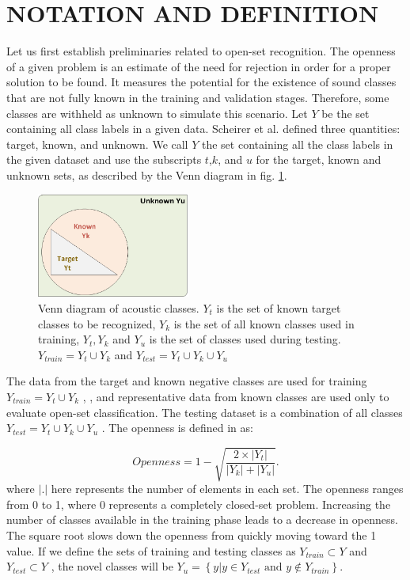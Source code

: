 \documentclass{ieeeaccess}
\begin{document}
\section{NOTATION AND DEFINITION} \label{sec:III}
Let us first establish preliminaries related to open-set recognition. The openness of a given problem is an estimate of the need for rejection in order for a proper solution to be found. It measures the potential for the existence of sound classes that are not fully known in the training and validation stages. Therefore, some classes are withheld as unknown to simulate this scenario. Let $Y$ be the set containing all class labels in a given data. Scheirer et al. \cite{b2} defined three quantities: target, known, and unknown. We call $Y$ the set containing all the class labels in the given dataset and use the subscripts $t$,$k$, and $u$  for the target, known and unknown sets, as described by the Venn diagram in fig. \ref{fig:fig1}.
\begin{figure}[t!]
	\centering
	\includegraphics[width=0.45\textwidth]{img/venndiagram.png}
	\caption{Venn diagram of acoustic classes. $Y_{t}$    is the set of known target classes to be recognized,   $Y_{k}$ is the set of all known classes used in training, $Y_{t},Y_{k}$ and $Y_{u}$  is the set of classes used during testing. $Y_{train}=Y_{t} \cup  Y_{k}  $  and $Y_{test}=Y_{t} \cup  Y_{k} \cup  Y_{u} $ }
	\label{fig:fig1}
\end{figure}
The data from the target and known negative classes are used for training  $Y_{train}=Y_{t} \cup  Y_{k}  $ ,  , and representative data from known classes are used only to evaluate open-set classification. The testing dataset is a combination of all classes  $Y_{test}=Y_{t} \cup  Y_{k} \cup  Y_{u} $ . The openness is defined in \cite{b1} as: 

\begin{equation}
Openness=1-\sqrt{\frac{2\times \left | Y_{t} \right |}{\left |Y_{k}\right |+\left |Y_{u}\right |}}.
\label{eq1}
\end{equation}
where $ \left |. \right |$  here represents the number of elements in each set. The openness ranges from 0 to 1, where 0 represents a completely closed-set problem. Increasing the number of classes available in the training phase leads to a decrease in openness. The square root slows down the openness from quickly moving toward the 1 value. If we define the sets of training and testing classes as  $ Y_{train} \subset Y$ and $ Y_{test}\subset Y $ , the novel classes will be  $ Y_{u}=\left \{ y|y\in Y_{test} \textrm{ and } y \notin Y_{train} \right \} $.
\end{document}
